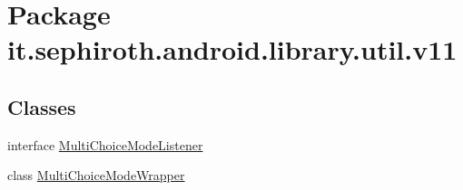 \hypertarget{namespaceit_1_1sephiroth_1_1android_1_1library_1_1util_1_1v11}{}\section{Package it.\+sephiroth.\+android.\+library.\+util.\+v11}
\label{namespaceit_1_1sephiroth_1_1android_1_1library_1_1util_1_1v11}
\subsection*{Classes}
\begin{DoxyCompactItemize}
\item 
interface \hyperlink{interfaceit_1_1sephiroth_1_1android_1_1library_1_1util_1_1v11_1_1_multi_choice_mode_listener}{Multi\+Choice\+Mode\+Listener}
\item 
class \hyperlink{classit_1_1sephiroth_1_1android_1_1library_1_1util_1_1v11_1_1_multi_choice_mode_wrapper}{Multi\+Choice\+Mode\+Wrapper}
\end{DoxyCompactItemize}
